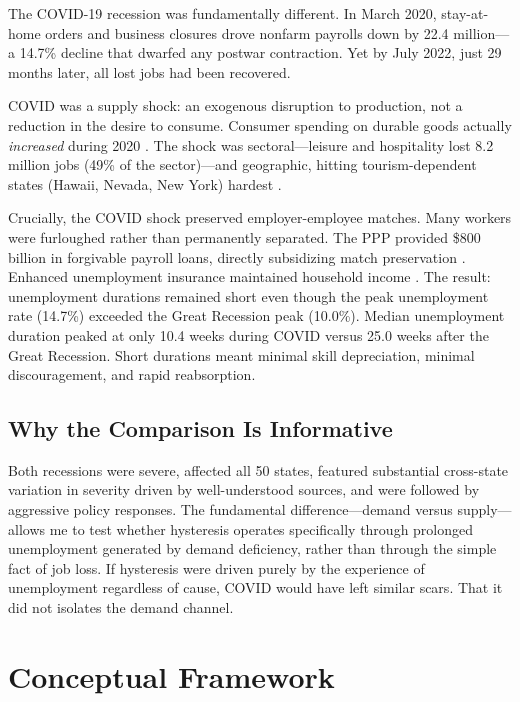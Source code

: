 \documentclass[12pt]{article}
\begin{document}
The COVID-19 recession was fundamentally different. In March 2020, stay-at-home orders and business closures drove nonfarm payrolls down by 22.4 million---a 14.7\% decline that dwarfed any postwar contraction. Yet by July 2022, just 29 months later, all lost jobs had been recovered.

COVID was a supply shock: an exogenous disruption to production, not a reduction in the desire to consume. Consumer spending on durable goods actually \textit{increased} during 2020 \citep{guerrieri2022macroeconomic}. The shock was sectoral---leisure and hospitality lost 8.2 million jobs (49\% of the sector)---and geographic, hitting tourism-dependent states (Hawaii, Nevada, New York) hardest \citep{cajner2020us}.

Crucially, the COVID shock preserved employer-employee matches. Many workers were furloughed rather than permanently separated. The PPP provided \$800 billion in forgivable payroll loans, directly subsidizing match preservation \citep{autor2022paycheck}. Enhanced unemployment insurance maintained household income \citep{ganong2020us}. The result: unemployment durations remained short even though the peak unemployment rate (14.7\%) exceeded the Great Recession peak (10.0\%). Median unemployment duration peaked at only 10.4 weeks during COVID versus 25.0 weeks after the Great Recession. Short durations meant minimal skill depreciation, minimal discouragement, and rapid reabsorption.

\subsection{Why the Comparison Is Informative}

Both recessions were severe, affected all 50 states, featured substantial cross-state variation in severity driven by well-understood sources, and were followed by aggressive policy responses. The fundamental difference---demand versus supply---allows me to test whether hysteresis operates specifically through prolonged unemployment generated by demand deficiency, rather than through the simple fact of job loss. If hysteresis were driven purely by the experience of unemployment regardless of cause, COVID would have left similar scars. That it did not isolates the demand channel.


\section{Conceptual Framework}
\label{sec:framework}
\end{document}
